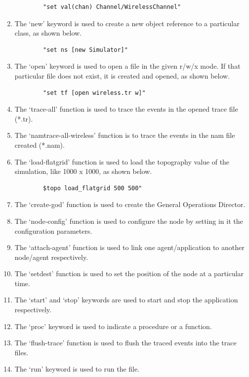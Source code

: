 \documentclass[11pt]{article}
\begin{document}
\begin{enumerate}
\begin{verbatim}
        "set val(chan) Channel/WirelessChannel"
    \end{verbatim}
    \item The ‘new’ keyword is used to create a new object reference to a particular class, as shown below.
          \begin{verbatim}
        "set ns [new Simulator]"
          \end{verbatim}
    \item The ‘open’ keyword is used to open a file in the given r/w/x mode. If that particular file does not exist,
          it is created and opened, as shown below.
          \begin{verbatim}
        "set tf [open wireless.tr w]"
          \end{verbatim}
    \item The ‘trace-all’ function is used to trace the events in the opened trace file (*.tr).
    \item The ‘namtrace-all-wireless’ function is to trace the events in the nam file created (*.nam).
    \item The ‘load-flatgrid’ function is used to load the topography value of the simulation, like 1000 x 1000,
          as shown below.
          \begin{verbatim}
        $topo load_flatgrid 500 500"
          \end{verbatim}
    \item The ‘create-god’ function is used to create the General Operations Director.
    \item The ‘node-config’ function is used to configure the node by setting in it the configuration parameters.
    \item The ‘attach-agent’ function is used to link one agent/application to another node/agent respectively.
    \item The ‘setdest’ function is used to set the position of the node at a particular time.
    \item The ‘start’ and ‘stop’ keywords are used to start and stop the application respectively.
    \item The ‘proc’ keyword is used to indicate a procedure or a function.
    \item The ‘flush-trace’ function is used to flush the traced events into the trace files.
    \item The ‘run’ keyword is used to run the file.
\end{enumerate}
\end{document}
